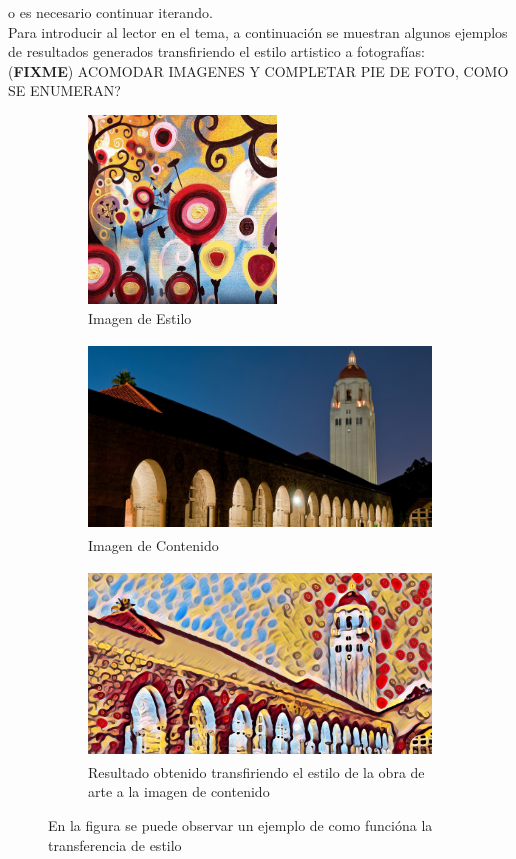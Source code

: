 \documentclass[a4paper,11pt,spanish]{book}
\newcommand*{\FIXME}[1]{{(\textbf{FIXME}) {#1}}}
\begin{document}
    o es necesario continuar iterando. \\
    Para introducir al lector en el tema, a continuación se muestran algunos ejemplos de resultados generados transfiriendo el estilo artistico a fotografías:\\
    \FIXME{ACOMODAR IMAGENES Y COMPLETAR PIE DE FOTO, COMO SE ENUMERAN?}
    \begin{figure}[h]
 
      \begin{subfigure}{0.7\textwidth}
	\includegraphics[width=0.9\linewidth, height=5cm]{./img/jhonson_style_candy.jpg} 
	\caption{Imagen de Estilo}
	\label{fig:candy}
      \end{subfigure}
    
      \begin{subfigure}{0.7\textwidth}
	\includegraphics[width=0.9\linewidth, height=5cm]{./img/jhonson_content_tower.jpg}
	\caption{Imagen de Contenido}
	\label{fig:tower}
      \end{subfigure}

      \begin{subfigure}{0.7\textwidth}
	\includegraphics[width=0.9\linewidth, height=5cm]{./img/jhonson_result_tower_candy.jpg}
	\caption{Resultado obtenido transfiriendo el estilo de la obra de arte a la imagen de contenido}
	\label{fig:candy_tower}
      \end{subfigure}
    \caption{En la figura se puede observar un ejemplo de como funcióna la transferencia de estilo}
    \label{fig:style_transfer_candy_tower}
    \end{figure}
  
\end{document}
